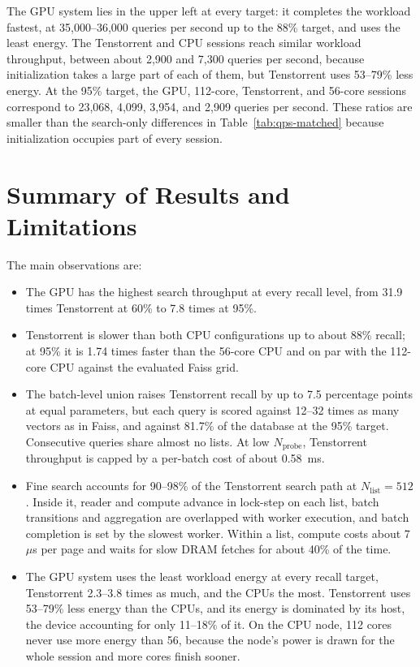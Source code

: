 The GPU system lies in the upper left at every target: it completes the
workload fastest, at 35,000--36,000 queries per second up to the 88\% target,
and uses the least energy. The Tenstorrent and CPU sessions reach similar
workload throughput, between about 2,900 and 7,300 queries per second, because
initialization takes a large part of each of them, but Tenstorrent uses
53--79\% less energy. At the 95\% target, the GPU, 112-core, Tenstorrent, and
56-core sessions correspond to 23,068, 4,099, 3,954, and 2,909 queries per
second. These ratios are smaller than the search-only differences in
Table~\ref{tab:qps-matched} because initialization occupies part of every
session.

\section{Summary of Results and Limitations}
\label{sec:results-summary}

The main observations are:
\begin{itemize}
    \item The GPU has the highest search throughput at every recall level, from
    31.9 times Tenstorrent at 60\% to 7.8 times at 95\%.
    \item Tenstorrent is slower than both CPU configurations up to about 88\%
    recall; at 95\% it is 1.74 times faster than the 56-core CPU and on par
    with the 112-core CPU against the evaluated Faiss grid.
    \item The batch-level union raises Tenstorrent recall by up to 7.5
    percentage points at equal parameters, but each query is scored against
    12--32 times as many vectors as in Faiss, and against 81.7\% of the
    database at the 95\% target. Consecutive queries share almost no lists. At low \(N_{\mathrm{probe}}\), Tenstorrent throughput is capped
    by a per-batch cost of about 0.58~ms.
    \item Fine search accounts for 90--98\% of the Tenstorrent search path at
    \(N_{\mathrm{list}}=512\). Inside it, reader and compute advance in
    lock-step on each list, batch transitions and aggregation are overlapped
    with worker execution, and batch completion is set by the slowest worker.
    Within a list, compute costs about 7~\(\mu\)s per page and waits for
    slow DRAM fetches for about 40\% of the time.
    \item The GPU system uses the least workload energy at every recall
    target, Tenstorrent 2.3--3.8 times as much, and the CPUs the most.
    Tenstorrent uses 53--79\% less energy than the CPUs, and its energy is
    dominated by its host, the device accounting for only 11--18\% of it. On
    the CPU node, 112 cores never use more energy than 56, because the node's
    power is drawn for the whole session and more cores finish sooner.
\end{itemize}

